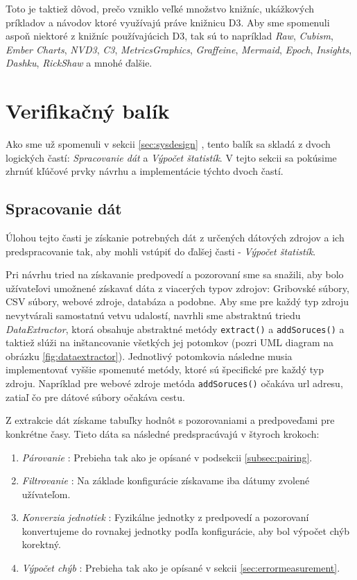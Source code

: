 Toto je taktiež dôvod, prečo vzniklo veľké množstvo knižníc, ukážkových príkladov a návodov ktoré využívajú práve knižnicu D3. Aby sme spomenuli aspoň niektoré z knižníc používajúcich D3, tak sú to napríklad \textit{Raw}, \textit{Cubism}, \textit{Ember Charts}, \textit{NVD3}, \textit{C3}, \textit{MetricsGraphics}, \textit{Graffeine}, \textit{Mermaid}, \textit{Epoch}, \textit{Insights}, \textit{Dashku}, \textit{RickShaw} a mnohé ďalšie. 

\section{Verifikačný balík}
Ako sme už spomenuli v sekcii \ref{sec:sysdesign} , tento balík sa skladá z dvoch logických častí: \textit{Spracovanie dát} a \textit{Výpočet štatistík}. V tejto sekcii sa pokúsime zhrnúť kľúčové prvky návrhu a implementácie týchto dvoch častí.
\subsection{Spracovanie dát}
Úlohou tejto časti je získanie potrebných dát z určených dátových zdrojov a ich predspracovanie tak, aby mohli vstúpiť do ďalšej časti - \textit{Výpočet štatistík}.

Pri návrhu tried na získavanie predpovedí a pozorovaní sme sa snažili, aby bolo užívateľovi umožnené získavať dáta z viacerých typov zdrojov: Gribovské súbory, CSV súbory, webové zdroje, databáza a podobne. Aby sme pre každý typ zdroju nevytvárali samostatnú vetvu udalostí, navrhli sme abstraktnú triedu \textit{DataExtractor}, ktorá obsahuje abstraktné metódy \texttt{extract()} a \texttt{addSoruces()} a taktiež slúži na inštancovanie všetkých jej potomkov (pozri UML diagram na obrázku \ref{fig:dataextractor}). Jednotlivý potomkovia následne musia implementovať vyššie spomenuté metódy, ktoré sú špecifické pre každý typ zdroju. Napríklad pre webové zdroje metóda \texttt{addSoruces()} očakáva url adresu, zatiaľ čo pre dátové súbory očakáva cestu.

Z extrakcie dát získame tabuľky hodnôt s pozorovaniami a predpoveďami pre konkrétne časy. Tieto dáta sa následné predspracúvajú v štyroch krokoch:

\begin{enumerate}
	\item \textit{Párovanie} : Prebieha tak ako je opísané v podsekcii \ref{subsec:pairing}.
	\item \textit{Filtrovanie} : Na základe konfigurácie získavame iba dátumy zvolené užívateľom.	\item \textit{Konverzia jednotiek} : Fyzikálne jednotky z predpovedí a pozorovaní konvertujeme do rovnakej jednotky podľa konfigurácie, aby bol výpočet chýb korektný.
	\item \textit{Výpočet chýb} : Prebieha tak ako je opísané v sekcii \ref{sec:errormeasurement}.
\end{enumerate}

